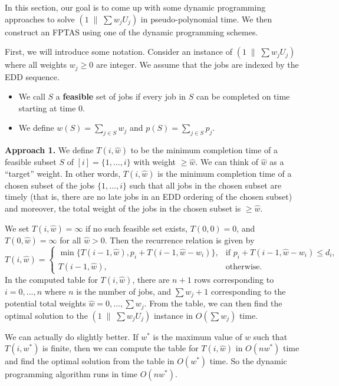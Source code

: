 In this section, our goal is to come up with some dynamic programming 
approaches to solve $(1\;\|\;\sum w_j U_j)$ in pseudo-polynomial time. 
We then construct an FPTAS using one of the dynamic programming schemes. 

First, we will introduce some notation. Consider an instance of 
$(1\;\|\;\sum w_j U_j)$ where all weights $w_j \geq 0$ are integer. 
We assume that the jobs are indexed by the EDD sequence. 
\begin{itemize}
    \item We call $S$ a {\bf feasible} set of jobs if every job in $S$ 
    can be completed on time starting at time $0$. 
    \item We define $w(S) = \sum_{j\in S} w_j$ and $p(S) = \sum_{j\in S} p_j$. 
\end{itemize}

{\bf Approach 1.} We define $T(i, \hat w)$ to be the minimum completion 
time of a feasible subset $S$ of $[i] = \{1, \dots, i\}$ with weight 
$\geq \hat w$. We can think of $\hat w$ as a ``target'' weight. 
In other words, $T(i, \hat w)$ is the minimum completion time of a 
chosen subset of the jobs $\{1, \dots, i\}$ such that all jobs in the 
chosen subset are timely (that is, there are no late jobs in an EDD ordering 
of the chosen subset) and moreover, the total weight of the jobs in the 
chosen subset is $\geq \hat w$.

We set $T(i, \hat w) = \infty$ if no such feasible set exists, 
$T(0, 0) = 0$, and $T(0, \hat w) = \infty$ for all $\hat w > 0$. Then 
the recurrence relation is given by 
\[ T(i, \hat w) = \begin{cases}
    \min\{T(i-1, \hat w), p_i + T(i-1, \hat w - w_i)\}, & \text{if } 
    p_i + T(i-1, \hat w - w_i) \leq d_i, \\ 
    T(i-1, \hat w), & \text{otherwise.} 
\end{cases} \] 
In the computed table for $T(i, \hat w)$, there are $n+1$ rows corresponding 
to $i = 0, \dots, n$ where $n$ is the number of jobs, and $\sum w_j + 1$ 
corresponding to the potential total weights $\hat w = 0, \dots, \sum w_j$. 
From the table, we can then find the optimal solution to the 
$(1\;\|\;\sum w_j U_j)$ instance in $O(\sum w_j)$ time.

We can actually do slightly better. If $w^*$ is the maximum value of 
$w$ such that $T(i, w^*)$ is finite, then we can compute the table for 
$T(i, \hat w)$ in $O(nw^*)$ time and find the optimal solution from the 
table in $O(w^*)$ time. So the dynamic programming algorithm runs in time 
$O(nw^*)$. 

